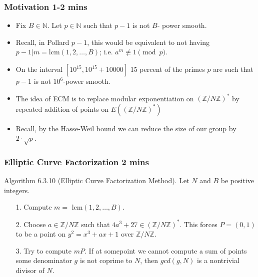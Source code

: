 \documentclass{beamer}
\begin{document}
\begin{frame}
\frametitle{Motivation 1-2 mins}
\begin{itemize}
\item Fix $B \in \mathbb{N}$. Let $p \in \mathbb{N}$ such that $p-1$ is not $B$- power smooth. 

\item Recall, in Pollard $p-1$, this would be equivalent to not having $p-1 \vert m = \text{lcm}(1,2, \ldots, B)$; i.e. $a^m \not \equiv 1 \pmod{p}$.

\item On the interval $[10^{15}, 10^{15} + 10000]$ 15 percent of the primes $p$ are such that $p-1$ is not $10^{6}$-power smooth. 

\item The idea of ECM is to replace modular exponentiation on $\left(\mathbb{Z}/N\mathbb{Z}\right)^*$ by repeated addition of points on $E\left(\left(\mathbb{Z}/N\mathbb{Z}\right)^*\right)$

\item Recall, by the Hasse-Weil bound we can reduce the size of our group by $2\cdot \sqrt{p}$. 
\end{itemize}
\end{frame}

\begin{frame}
\frametitle{Elliptic Curve Factorization 2 mins}
Algorithm 6.3.10 (Elliptic Curve Factorization Method). Let $N$ and $B$ be positive integers.
\begin{itemize}
\item[1.] Compute $m =$ lcm$(1,2,\ldots, B)$. 
\item[2.] Choose $a \in \mathbb{Z}/N\mathbb{Z}$ such that $4a^3 + 27 \in \left(\mathbb{Z}/N\mathbb{Z}\right)^*$. This forces $P = (0,1)$ to be a point on $y^2 = x^3 + ax +1$ over $\mathbb{Z}/N\mathbb{Z}$. 
\item[3.] Try to compute $mP$. If at somepoint we cannot compute a sum of points some denominator $g$ is not coprime to $N$, then $gcd(g,N)$ is a nontrivial divisor of $N$.
\end{itemize}
\end{frame}
\end{document}
